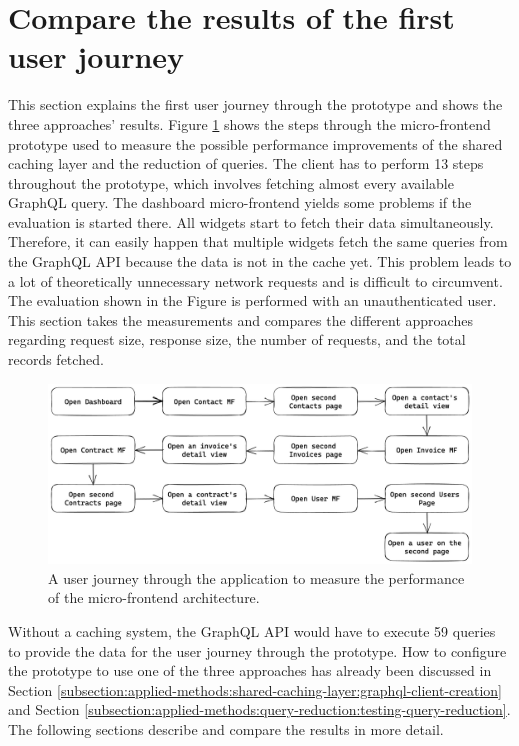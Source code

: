 \section{Compare the results of the first user journey}\label{section:results:comparison-first-journey}

This section explains the first user journey through the prototype and shows the three approaches' results. Figure \ref{fig:results:evaluation-first-path} shows the steps through the micro-frontend prototype used to measure the possible performance improvements of the shared caching layer and the reduction of queries. The client has to perform 13 steps throughout the prototype, which involves fetching almost every available GraphQL query. The dashboard micro-frontend yields some problems if the evaluation is started there. All widgets start to fetch their data simultaneously. Therefore, it can easily happen that multiple widgets fetch the same queries from the GraphQL \ac{API} because the data is not in the cache yet. This problem leads to a lot of theoretically unnecessary network requests and is difficult to circumvent. The evaluation shown in the Figure is performed with an unauthenticated user. This section takes the measurements and compares the different approaches regarding request size, response size, the number of requests, and the total records fetched.

\ifshowImages
\begin{figure}[H]
  \centering
  \includegraphics[width=1\linewidth]{images/results/evaluation-first-path.png}
  \caption{A user journey through the application to measure the performance of the micro-frontend architecture.}\label{fig:results:evaluation-first-path}
\end{figure}
\fi

\noindent Without a caching system, the GraphQL \ac{API} would have to execute 59 queries to provide the data for the user journey through the prototype. How to configure the prototype to use one of the three approaches has already been discussed in Section \ref{subsection:applied-methods:shared-caching-layer:graphql-client-creation} and Section \ref{subsection:applied-methods:query-reduction:testing-query-reduction}. The following sections describe and compare the results in more detail.

